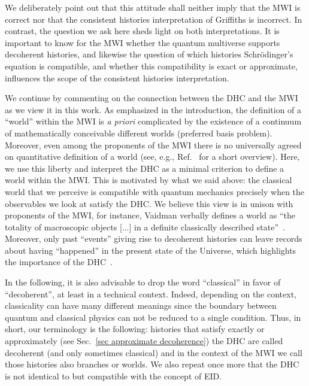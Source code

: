 \documentclass[pre,onecolumn,12pt,aps,longbibliography,nofootinbib]{revtex4-2}
\newcommand{\blue}[1]{#1}
\begin{document}
We deliberately point out that this attitude shall neither imply that the MWI is correct nor that the consistent histories interpretation of Griffiths is incorrect. In contrast, the question we ask here sheds light on both interpretations. It is important to know for the MWI whether the quantum multiverse supports decoherent histories, and likewise the question of which histories Schr\"odinger's equation is compatible, and whether this compatibility is exact or approximate, influences the scope of the consistent histories interpretation.

We continue by commenting on the connection between the DHC and the MWI as we view it in this work. As emphasized in the introduction, the definition of a ``world'' within the MWI is \emph{a priori} complicated by the existence of a continuum of mathematically conceivable different worlds (preferred basis problem). Moreover, even among the proponents of the MWI there is no universally agreed on quantitative definition of a world \blue{(see, e.g., Ref.~\cite{JessRiedelBlog2023} for a short overview)}. Here, we use this liberty and interpret the DHC as a minimal criterion to define a world within the MWI. This is motivated by what we said above: the classical world that we perceive is compatible with quantum mechanics precisely when the observables we look at satisfy the DHC. We believe this view is in unison with proponents of the MWI, for instance, Vaidman verbally defines a world as ``the totality of macroscopic objects [...] in a definite classically described state''~\cite{Vaidman2021}. Moreover, \blue{only past ``events'' giving rise to decoherent histories can leave records about having ``happened'' in the present state of the Universe, which highlights the importance of the DHC}~\cite{AlbrechtPRD1992, GellMannHartlePRD1993, FinkelsteinPRD1993, PazZurekPRD1993, HalliwellPRD1999, DoddHalliwellPRD2003, RiedelZurekZwolakPRA2016, HartleArXiv2016}.

In the following, it is also advisable to drop the word ``classical'' in favor of ``decoherent'', at least in a technical context. Indeed, depending on the context, classicality can have many different meanings since the boundary between quantum and classical physics can not be reduced to a single condition. Thus, in short, our terminology is the following: histories that satisfy exactly or approximately (see Sec.~\ref{sec approximate decoherence}) the DHC are called decoherent (and only sometimes classical) and in the context of the MWI we call those histories also branches or worlds. We also repeat once more that the DHC is not identical to but compatible with the concept of EID.
\end{document}
